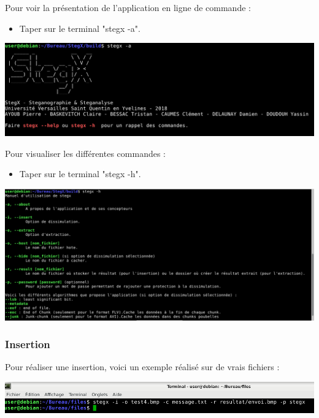 \documentclass[11pt]{article}
\begin{document}
Pour voir la présentation de l'application en ligne de commande :
\begin{itemize}
\item Taper sur le terminal "stegx -a".
\end{itemize}

\vspace{0.5cm}
\hspace{0.5cm}
\includegraphics[scale=0.6]{pictures/present.png}
\vspace{1cm}

Pour visualiser les différentes commandes : 
\begin{itemize}
\item Taper sur le terminal "stegx -h".
\end{itemize}

\vspace{0.5cm}
\hspace{-0.5cm}
\includegraphics[scale=0.5]{pictures/help.png}
\vspace{1cm}

\subsubsection{Insertion}

Pour réaliser une insertion, voici un exemple réalisé sur de vrais 
fichiers : 

\vspace{0.5cm}
\hspace{-2cm}
\includegraphics[scale=0.8]{pictures/insertion.png}
\vspace{1cm}
\end{document}
